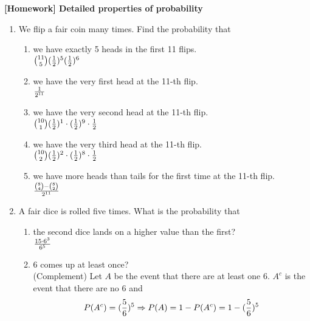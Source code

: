 \documentclass[12pt]{article}%
\newcommand{\0}{{\bf 0}}
\newcommand{\ra}[1]{\renewcommand{\arraystretch}{#1}}
\begin{document}
\newcommand{\ngi}{n \ra \infty}

\pagestyle{myheadings} 

\thispagestyle{plain}


\begin{center}
{\Large\bf [Homework] Detailed properties of probability} 
\end{center}






\begin{enumerate}





\item
We flip a fair coin many times.
Find the probability that
\begin{enumerate}
\item we have exactly 5 heads in the first 11 flips.
\\
{\color{blue}{\bf Sol.}}
${11 \choose 5}(\frac{1}{2})^5(\frac{1}{2})^6$
\item we have the very first head at the 11-th flip.
\\
{\color{blue}{\bf Sol.}}
$\frac{1}{2^{11}}$
\item we have the very second head at the 11-th flip.
\\
{\color{blue}{\bf Sol.}}
${10 \choose 1}(\frac{1}{2})^1\cdot (\frac{1}{2})^9\cdot \frac{1}{2}$

\item we have the very third head at the 11-th flip.
\\
{\color{blue}{\bf Sol.}}
${10 \choose 2}(\frac{1}{2})^2\cdot (\frac{1}{2})^8\cdot \frac{1}{2}$
\item we have more heads than tails for the first time at the 11-th flip.
\\
{\color{blue}{\bf Sol.}}
$\frac{{8 \choose 4}-{8 \choose 2}}{2^{11}}$



\end{enumerate}





\item 
A fair dice is rolled five times. 
What is the probability that
\begin{enumerate}
\item the second dice lands on a higher value than the first?
\\
{\color{blue}{\bf Sol.}}
$\frac{15\cdot6^3}{6^5}$
\item 6 comes up at least once?
\\
{\color{blue}{\bf Sol.}}
(Complement)
Let $A$ be the event that there are at least one 6.
$A^c$ is the event that there are no 6 and 
$$
P(A^c)=(\frac{5}{6})^5
\Rightarrow
P(A)=1-P(A^c)=1-(\frac{5}{6})^5
$$


\end{enumerate}
\end{enumerate}
\end{document}
